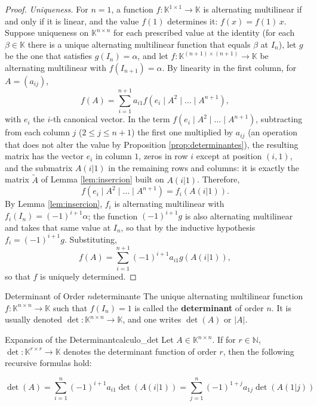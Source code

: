 \documentclass[11pt, a4paper]{article}
\begin{document}
\begin{proof}
\textit{Uniqueness.} For $n=1$, a function $f: \mathbb{K}^{1 \times 1} \to \mathbb{K}$ is alternating multilinear if and only if it is linear, and the value $f(1)$ determines it: $f(x) = f(1) \, x$. Suppose uniqueness on $\mathbb{K}^{n \times n}$ for each prescribed value at the identity (for each $\beta \in \mathbb{K}$ there is a unique alternating multilinear function that equals $\beta$ at $I_n$), let $g$ be the one that satisfies $g(I_n) = \alpha$, and let $f: \mathbb{K}^{(n+1) \times (n+1)} \to \mathbb{K}$ be alternating multilinear with $f(I_{n+1}) = \alpha$. By linearity in the first column, for $A = (a_{ij})$,
\[
f(A) = \sum_{i=1}^{n+1} a_{i1} f(e_i \mid A^2 \mid \dots \mid A^{n+1}),
\]
with $e_i$ the $i$-th canonical vector. In the term $f(e_i \mid A^2 \mid \dots \mid A^{n+1})$, subtracting from each column $j$ ($2 \le j \le n+1$) the first one multiplied by $a_{ij}$ (an operation that does not alter the value by Proposition \ref{prop:determinantes}), the resulting matrix has the vector $e_i$ in column $1$, zeros in row $i$ except at position $(i,1)$, and the submatrix $A(i|1)$ in the remaining rows and columns: it is exactly the matrix $\tilde{A}$ of Lemma \ref{lem:insercion} built on $A(i|1)$. Therefore,
\[
f(e_i \mid A^2 \mid \dots \mid A^{n+1}) = f_i(A(i|1)).
\]
By Lemma \ref{lem:insercion}, $f_i$ is alternating multilinear with $f_i(I_n) = (-1)^{i+1} \alpha$; the function $(-1)^{i+1} g$ is also alternating multilinear and takes that same value at $I_n$, so that by the inductive hypothesis $f_i = (-1)^{i+1} g$. Substituting,
\[
f(A) = \sum_{i=1}^{n+1} (-1)^{i+1} a_{i1} g(A(i|1)),
\]
so that $f$ is uniquely determined.
\end{proof}

\begin{definicion}{Determinant of Order $n$}{determinante}
The unique alternating multilinear function $f: \mathbb{K}^{n \times n} \to \mathbb{K}$ such that $f(I_n) = 1$ is called the \textbf{determinant} of order $n$.
It is usually denoted $\det: \mathbb{K}^{n \times n} \to \mathbb{K}$, and one writes $\det(A)$ or $|A|$.
\end{definicion}

\begin{corolario}{Expansion of the Determinant}{calculo_det}
Let $A \in \mathbb{K}^{n \times n}$. If for $r \in \mathbb{N}$, $\det: \mathbb{K}^{r \times r} \to \mathbb{K}$ denotes the determinant function of order $r$, then the following recursive formulas hold:

\[ \det(A) = \sum_{i=1}^{n} (-1)^{i+1} a_{i1} \det(A(i|1)) = \sum_{j=1}^{n} (-1)^{1+j} a_{1j} \det(A(1|j)) \]
\end{corolario}
\end{document}
